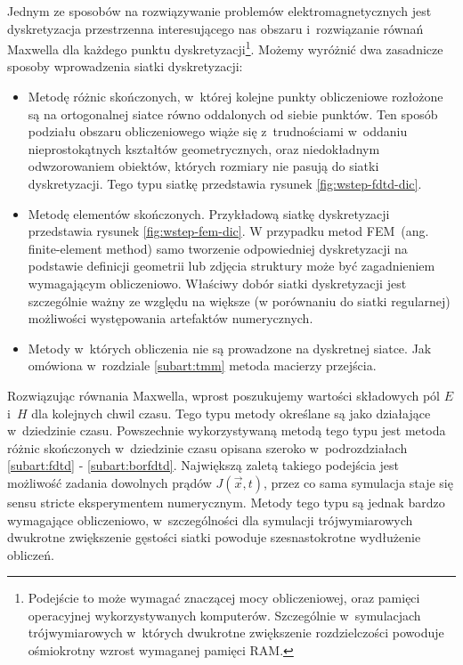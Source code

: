 Jednym ze sposobów na rozwiązywanie problemów elektromagnetycznych jest dyskretyzacja przestrzenna interesującego nas obszaru i~rozwiązanie równań Maxwella dla każdego punktu dyskretyzacji\footnote{Podejście to może wymagać znaczącej mocy obliczeniowej, oraz pamięci operacyjnej wykorzystywanych komputerów. Szczególnie w~symulacjach trójwymiarowych w~których dwukrotne zwiększenie rozdzielczości powoduje ośmiokrotny wzrost wymaganej pamięci RAM. }. Możemy wyróżnić dwa zasadnicze sposoby wprowadzenia siatki dyskretyzacji:
\begin{itemize}
\item Metodę różnic skończonych, w~której kolejne punkty obliczeniowe rozłożone są na ortogonalnej siatce równo oddalonych od siebie punktów. Ten sposób podziału obszaru obliczeniowego wiąże się z~trudnościami w~oddaniu nieprostokątnych kształtów geometrycznych, oraz niedokładnym odwzorowaniem obiektów, których rozmiary nie pasują do siatki dyskretyzacji. Tego typu siatkę przedstawia rysunek \ref{fig:wstep-fdtd-dic}.
\item Metodę elementów skończonych. Przykładową siatkę dyskretyzacji przedstawia rysunek \ref{fig:wstep-fem-dic}. W przypadku metod  FEM~(ang. finite-element method) samo tworzenie odpowiedniej dyskretyzacji na podstawie definicji geometrii lub zdjęcia struktury może być zagadnieniem wymagającym obliczeniowo. Właściwy dobór siatki dyskretyzacji jest szczególnie ważny ze względu na większe (w porównaniu do siatki regularnej) możliwości występowania artefaktów numerycznych.  
\item Metody w~których obliczenia nie są prowadzone na dyskretnej siatce. Jak omówiona w~rozdziale \ref{subart:tmm} metoda macierzy przejścia.
\end{itemize}

Rozwiązując równania Maxwella, wprost poszukujemy wartości składowych pól $E$ i~$H$ dla kolejnych chwil czasu. Tego typu metody określane są jako działające w~dziedzinie czasu. Powszechnie wykorzystywaną metodą tego typu jest metoda różnic skończonych w~dziedzinie czasu opisana szeroko w~podrozdziałach \ref{subart:fdtd} - \ref{subart:borfdtd}. Największą zaletą takiego podejścia jest możliwość zadania dowolnych prądów $J(\vec{x},t)$, przez co sama symulacja staje się sensu stricte eksperymentem numerycznym. Metody tego typu są jednak bardzo wymagające obliczeniowo, w~szczególności dla symulacji trójwymiarowych dwukrotne zwiększenie gęstości siatki powoduje szesnastokrotne wydłużenie obliczeń. 

